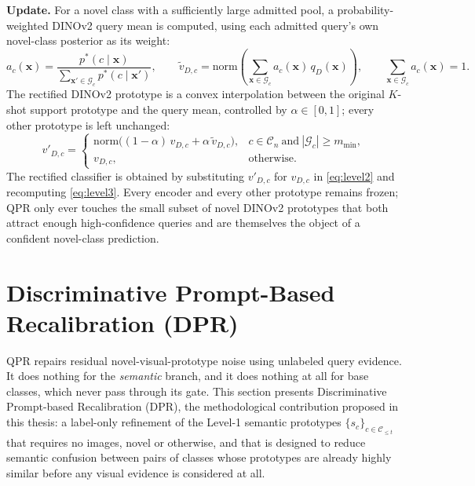 \documentclass{iutbscthesis}
\begin{document}
\textbf{Update.} For a novel class with a sufficiently large admitted pool, a probability-weighted DINOv2 query mean is computed, using each admitted query's own novel-class posterior as its weight:
\begin{equation}
    a_c(\mathbf{x}) = \frac{p^*(c \mid \mathbf{x})}{\sum_{\mathbf{x}' \in \mathcal{G}_c} p^*(c \mid \mathbf{x}')}, \qquad
    \tilde v_{D,c} = \mathrm{norm}\!\left(\sum_{\mathbf{x} \in \mathcal{G}_c} a_c(\mathbf{x})\, q_D(\mathbf{x})\right), \qquad \sum_{\mathbf{x} \in \mathcal{G}_c} a_c(\mathbf{x}) = 1.
    \label{eq:querymean}
\end{equation}
The rectified DINOv2 prototype is a convex interpolation between the original $K$-shot support prototype and the query mean, controlled by $\alpha \in [0,1]$; every other prototype is left unchanged:
\begin{equation}
    v'_{D,c} =
    \begin{cases}
        \mathrm{norm}\big((1-\alpha)\, v_{D,c} + \alpha\, \tilde v_{D,c}\big), & c \in \mathcal{C}_n \ \text{and} \ |\mathcal{G}_c| \ge m_{\min}, \\
        v_{D,c}, & \text{otherwise.}
    \end{cases}
    \label{eq:qprupdate}
\end{equation}
The rectified classifier is obtained by substituting $v'_{D,c}$ for $v_{D,c}$ in \autoref{eq:level2} and recomputing \autoref{eq:level3}. Every encoder and every other prototype remains frozen; QPR only ever touches the small subset of novel DINOv2 prototypes that both attract enough high-confidence queries and are themselves the object of a confident novel-class prediction.

\section{Discriminative Prompt-Based Recalibration (DPR)}
\label{sec:dpr}

QPR repairs residual novel-visual-prototype noise using unlabeled query evidence. It does nothing for the \emph{semantic} branch, and it does nothing at all for base classes, which never pass through its gate. This section presents Discriminative Prompt-based Recalibration (DPR), the methodological contribution proposed in this thesis: a label-only refinement of the Level-1 semantic prototypes $\{s_c\}_{c \in \mathcal{C}_{\le t}}$ that requires no images, novel or otherwise, and that is designed to reduce semantic confusion between pairs of classes whose prototypes are already highly similar before any visual evidence is considered at all.
\end{document}
